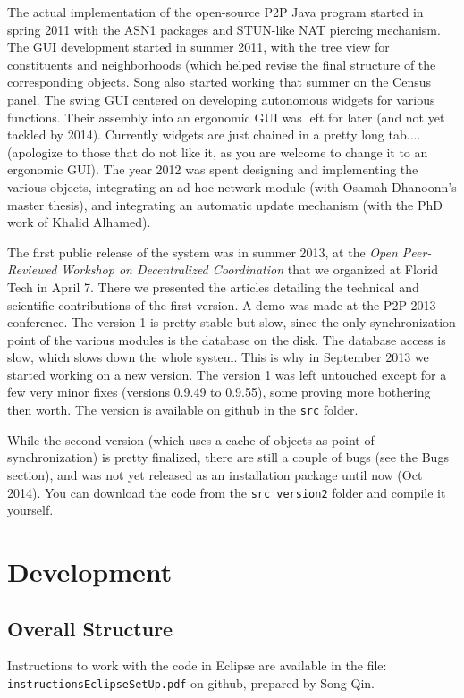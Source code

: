 \documentclass{book}
\begin{document}
The actual implementation of the open-source P2P Java program started in spring 2011 with the ASN1 packages and STUN-like NAT piercing mechanism.  The GUI development
started in summer 2011, with the tree view for constituents and neighborhoods (which helped revise the final structure of the corresponding objects. Song also started working
that summer on the Census panel. The swing GUI centered on developing autonomous widgets for various functions. Their assembly into an ergonomic GUI was left for
later (and not yet tackled by 2014). Currently widgets are just chained in a pretty long tab.... (apologize to those that do not like it, as you are welcome to change it to an ergonomic GUI).
The year 2012 was spent designing and implementing the various objects, integrating an ad-hoc network module (with Osamah Dhanoonn's master thesis), and integrating an automatic update mechanism
(with the PhD work of Khalid Alhamed).

The first public release of the system was in summer 2013, at the {\em Open Peer-Reviewed Workshop on Decentralized Coordination} that we organized at Florid Tech in April 7. There we presented the articles detailing the technical and scientific contributions of the first version. A demo was made at the P2P 2013 conference. The version 1 is pretty stable but slow, since the only synchronization
point of the various modules is the database on the disk. The database access is slow, which slows down the whole system. This is why in September 2013 we started working on a new version.
The version 1 was left untouched except for a few very minor fixes (versions 0.9.49 to 0.9.55), some proving more bothering then worth. The version is available on github in the {\tt src} folder.

While the second version (which uses a cache of objects as point of synchronization) is pretty finalized, there are still a couple of bugs (see the Bugs section), and was not yet released as an installation package until now (Oct 2014). You can download the code from the {\tt src\_version2} folder and compile it yourself.

\chapter{Development}
\section{Overall Structure}

Instructions to work with the code in Eclipse are available in the file: {\tt instructionsEclipseSetUp.pdf} on github, prepared by Song Qin.
\end{document}
